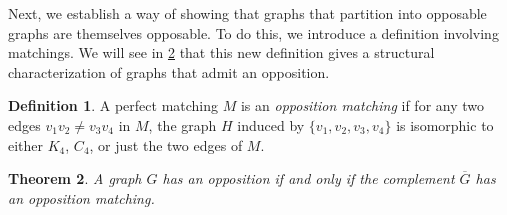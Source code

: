 \documentclass[11pt]{article}
\newtheorem{theorem}{Theorem}[section]
\theoremstyle{definition}
\newtheorem{definition}[theorem]{Definition}
\begin{document}
Next, we establish a way of showing that graphs that partition into opposable
graphs are themselves opposable. To do this, we introduce a definition
involving matchings. We will see in \cref{thm:matchingCharacterization} that
this new definition gives a structural characterization of graphs that admit an
opposition.

\begin{definition}
    A perfect matching $M$ is an \emph{opposition matching} if for any two
    edges $v_1v_2\neq v_3v_4$ in $M$, the graph $H$ induced by
    $\{v_1,v_2,v_3,v_4\}$ is isomorphic to either $K_4$, $C_4$, or just the two
    edges of $M$.
\end{definition}

\begin{theorem}\label{thm:matchingCharacterization}
    A graph $G$ has an opposition if and only if the complement $\overline{G}$
    has an opposition matching.
\end{theorem}
\end{document}
